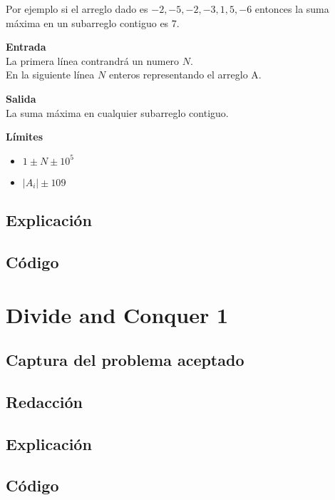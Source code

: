 \documentclass[12pt]{article}
\begin{document}
      Por ejemplo si el arreglo dado es ${-2, -5, -2, -3, 1, 5, -6}$ entonces la suma máxima en un subarreglo contiguo es $7$.

      \textbf{Entrada}  \\
      La primera línea contrandrá un numero $N$.\\
      En la siguiente línea $N$ enteros representando el arreglo A.

      \textbf{Salida} \\
      La suma máxima en cualquier subarreglo contiguo.

      \textbf{Límites}  \\
      \begin{itemize}
        \item $1 \pm N \pm 10^{5}$
        \item $ |A_{i}| \pm 10{9} $
      \end{itemize}







    \subsection{Explicación}

    \subsection{Código}

  \section{Divide and Conquer 1}

    \subsection{Captura del problema aceptado}

    \subsection{Redacción}

    \subsection{Explicación}

    \subsection{Código}
\end{document}
